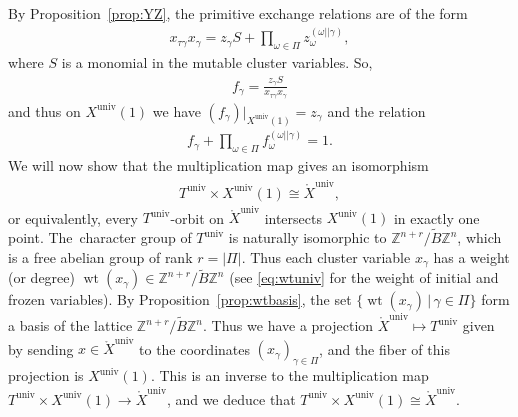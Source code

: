 \documentclass[pdftex]{sigma}%
\def\Z{{\mathbb Z}}
\def\Xo{{\mathring{X}}}
\def\univ{{\operatorname{univ}}}
\def\tB{{\tilde B}}
\def\wt{\operatorname{wt}}
\def\tB{{\tilde B}}
\numberwithin{equation}{section}
\begin{document}
By Proposition~\ref{prop:YZ}, the primitive exchange relations are of the form
\begin{gather*}
x_{\tau \gamma} x_\gamma = z_\gamma S + \prod_{\omega \in \Pi } z_{\omega}^{(\omega||\gamma)},
\end{gather*}
where $S$ is a monomial in the mutable cluster variables. So,
\begin{gather*}
f_\gamma = \frac{z_\gamma S}{x_{\tau\gamma} x_\gamma }
\end{gather*}
and thus on $X^\univ(1)$ we have $(f_\gamma)|_{X^\univ(1)} = z_\gamma$ and the relation
\begin{gather}\label{eq:f}
f_\gamma + \prod_{\omega \in \Pi } f_{\omega}^{(\omega||\gamma)} = 1.
\end{gather}
We will now show that the multiplication map gives an isomorphism
\begin{gather*}%
T^\univ \times X^\univ(1) \cong \Xo^\univ,
\end{gather*}
or equivalently, every $T^\univ$-orbit on $\Xo^\univ$ intersects $X^\univ(1)$ in exactly one point. The~character group of $T^\univ$ is naturally isomorphic to $\Z^{n+r}/\tB \Z^n$, which is a free abelian group of rank $r = |\Pi|$. Thus each cluster variable $x_\gamma$ has a weight (or degree) $\wt(x_\gamma) \in \Z^{n+r}/\tB \Z^n$ (see \eqref{eq:wtuniv} for the weight of initial and frozen variables). By Proposition~\ref{prop:wtbasis}, %
the set $\{\wt(x_\gamma) \,|\, \gamma \in \Pi\}$ form a basis of the lattice $\Z^{n+r}/\tB \Z^n$. Thus we have a projection $\Xo^\univ \mapsto T^\univ$ given by sending $x \in \Xo^\univ$ to the coordinates $(x_\gamma)_{\gamma \in \Pi}$, and the fiber of this projection is $X^\univ(1)$. This is an inverse to the multiplication map $T^\univ \times X^\univ(1) \to \Xo^\univ$, and we deduce that $T^\univ \times X^\univ(1) \cong \Xo^\univ$.
\end{document}
